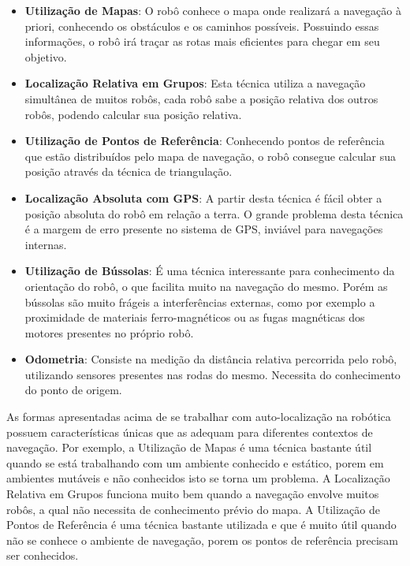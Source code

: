 	\begin{itemize}
		\item \textbf{Utilização de Mapas}: O robô conhece o mapa onde realizará a navegação à priori, conhecendo os obstáculos e os caminhos possíveis. Possuindo essas informações, o robô irá traçar as rotas mais eficientes para chegar em seu objetivo.

		\item \textbf{Localização Relativa em Grupos}: Esta técnica utiliza a navegação simultânea de muitos robôs, cada robô sabe a posição relativa dos outros robôs, podendo calcular sua posição relativa.

		\item \textbf{Utilização de Pontos de Referência}: Conhecendo pontos de referência que estão distribuídos pelo mapa de navegação, o robô consegue calcular sua posição através da técnica de triangulação.

		\item \textbf{Localização Absoluta com GPS}: A partir desta técnica é fácil obter a posição absoluta do robô em relação a terra. O grande problema desta técnica é a margem de erro presente no sistema de GPS, inviável para navegações internas.

		\item \textbf{Utilização de Bússolas}: É uma técnica interessante para conhecimento da orientação do robô, o que facilita muito na navegação do mesmo. Porém as bússolas são muito frágeis a interferências externas, como por exemplo a proximidade de materiais ferro-magnéticos ou as fugas magnéticas dos motores presentes no próprio robô.

		\item \textbf{Odometria}: Consiste na medição da distância relativa percorrida pelo robô, utilizando sensores presentes nas rodas do mesmo. Necessita do conhecimento do ponto de origem.
		 
	\end{itemize}

	As formas apresentadas acima de se trabalhar com auto-localização na robótica possuem características únicas que as adequam para diferentes contextos de navegação. Por exemplo, a Utilização de Mapas é uma técnica bastante útil quando se está trabalhando com um ambiente conhecido e estático, porem em ambientes mutáveis e não conhecidos isto se torna um problema. A Localização Relativa em Grupos funciona muito bem quando a navegação envolve muitos robôs, a qual não necessita de conhecimento prévio do mapa. A Utilização de Pontos de Referência é uma técnica bastante utilizada e que é muito útil quando não se conhece o ambiente de navegação, porem os pontos de referência precisam ser conhecidos.

